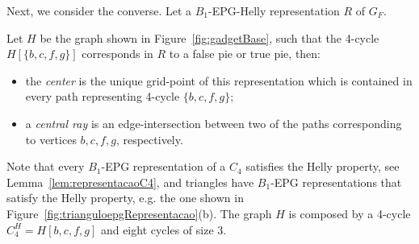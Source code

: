 \documentclass[runningheads]{llncs}
\begin{document}


Next, we consider the converse. Let a $B_1$-EPG-Helly representation $R$ of $G_F$.



\begin{definition}
Let $H$ be the graph shown in Figure~\ref{fig:gadgetBase}, such that the 4-cycle $H[\{b, c, f, g \}]$ corresponds in $R$ to a false pie or true pie, then:

\begin{itemize}
\item the \emph{center} is the unique grid-point of this representation which is contained in every path representing 4-cycle $ \{b, c, f, g \}$; \label{lab:lab1}

\item a \emph {central ray} is an edge-intersection  between two of the paths corresponding to vertices  $ b, c, f, g$, respectively.
\end{itemize}
\end{definition}


Note that every $B_1$-EPG representation of a $C_4$ satisfies the Helly property, see Lemma~\ref{lem:representacaoC4}, and triangles have $B_1$-EPG representations that satisfy the Helly property, e.g. the one shown in Figure~\ref{fig:trianguloepgRepresentacao}(b). The graph $H$ is composed by a 4-cycle  $C_4^{H}=H[b, c, f, g]$ and eight cycles of size 3.%
\end{document}
